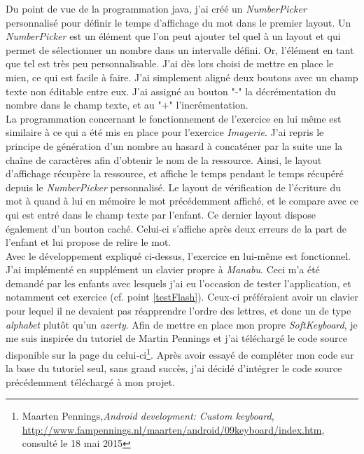 Du point de vue de la programmation java, j'ai créé un \textit{NumberPicker} personnalisé pour définir le temps d'affichage du mot dans le premier layout. Un \textit{NumberPicker} est un élément que l'on peut ajouter tel quel à un layout et qui permet de sélectionner un nombre dans un intervalle défini. Or, l'élément en tant que tel est très peu personnalisable. J'ai dès lors choisi de mettre en place le mien, ce qui est facile à faire. J'ai simplement aligné deux boutons avec un champ texte non éditable entre eux. J'ai assigné au bouton "-" la décrémentation du nombre dans le champ texte, et au "+" l'incrémentation.\\

La programmation concernant le fonctionnement de l'exercice en lui même est similaire à ce qui a été mis en place pour l'exercice \textit{Imagerie}. J'ai repris le principe de génération d'un nombre au hasard à concaténer par la suite une la chaîne de caractères afin d'obtenir le nom de la ressource. Ainsi, le layout d'affichage récupère la ressource, et affiche le temps pendant le temps récupéré depuis le \textit{NumberPicker} personnalisé. Le layout de vérification de l'écriture du mot à quand à lui en mémoire le mot précédemment affiché, et le compare avec ce qui est entré dans le champ texte par l'enfant. Ce dernier layout dispose également d'un bouton caché. Celui-ci s'affiche après deux erreurs de la part de l'enfant et lui propose de relire le mot.\\


Avec le développement expliqué ci-dessus, l'exercice en lui-même est fonctionnel. J'ai implémenté en supplément un clavier propre à \textit{Manabu}\label{clavier}. Ceci m'a été demandé par les enfants avec lesquels j'ai eu l'occasion de tester l'application, et notamment cet exercice (cf. point \ref{testFlash}). Ceux-ci préféraient avoir un clavier pour lequel il ne devaient pas réapprendre l'ordre des lettres, et donc un de type \textit{alphabet} plutôt qu'un \textit{azerty}. Afin de mettre en place mon propre \textit{SoftKeyboard}, je me suis inspirée du tutoriel de Martin Pennings et j'ai téléchargé le code source disponible sur la page du celui-ci\footnote{Maarten Pennings,\textit{Android development: Custom keyboard}, \url{http://www.fampennings.nl/maarten/android/09keyboard/index.htm}, consulté le 18 mai 2015}. Après avoir essayé de compléter mon code sur la base du tutoriel seul, sans grand succès, j'ai décidé d'intégrer le code source précédemment téléchargé à mon projet.\\


